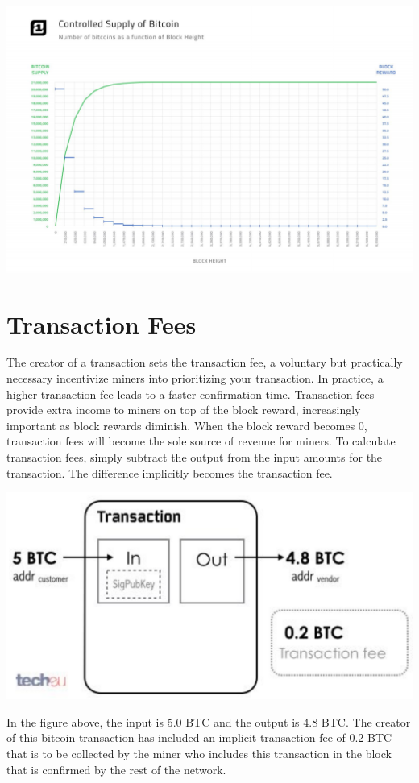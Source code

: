 \documentclass[full.tex]{subfiles}
\begin{document}
    \includegraphics[scale=0.33]{supply_cap}
    \section*{Transaction Fees}
    
    The creator of a transaction sets the transaction fee, a voluntary but practically necessary incentivize miners into prioritizing your transaction. In practice, a higher transaction fee leads to a faster confirmation time. Transaction fees provide extra income to miners on top of the block reward, increasingly important as block rewards diminish. When the block reward becomes 0, transaction fees will become the sole source of revenue for miners. To calculate transaction fees, simply subtract the output from the input amounts for the transaction. The difference implicitly becomes the transaction fee. 
    \begin{center}
    \includegraphics[scale=0.22]{transaction_fee}
    \end{center}
    
    In the figure above, the input is 5.0 BTC and the output is 4.8 BTC. The creator of this bitcoin transaction has included an implicit transaction fee of 0.2 BTC that is to be collected by the miner who includes this transaction in the block that is confirmed by the rest of the network.
\end{document}
